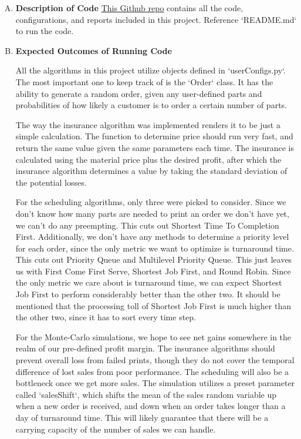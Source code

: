 \documentclass[11pt]{article}
\begin{document}
\begin{enumerate}[A. ]
    \item \textbf{Description of Code}
        \href{https://github.com/tylerTaerak/PrintingMoney}{This Github repo} contains all the code, configurations, and reports included in this project. Reference
        `README.md` to run the code.
    \item \textbf{Expected Outcomes of Running Code}

        All the algorithms in this project utilize objects defined in `userConfigs.py`. The most important one to keep track of is the `Order` class. It has the
        ability to generate a random order, given any user-defined parts and probabilities of how likely a customer is to order a certain number of parts.

        The way the insurance algorithm was implemented renders it to be just a simple calculation. The function to determine price should run very fast, and return the
        same value given the same parameters each time. The insurance is calculated using the material price plus the desired profit, after which the insurance algorithm
        determines a value by taking the standard deviation of the potential losses.

        For the scheduling algorithms, only three were picked to consider. Since we don't know how many parts are needed to print an order we don't have yet, we can't
        do any preempting. This cuts out Shortest Time To Completion First. Additionally, we don't have any methods to determine a priority level for each order,
        since the only metric we want to optimize is turnaround time. This cuts out Priority Queue and Multilevel Priority Queue. This just leaves us with First Come
        First Serve, Shortest Job First, and Round Robin. Since the only metric we care about is turnaround time, we can expect Shortest Job First to perform considerably
        better than the other two. It should be mentioned that the processing toll of Shortest Job First is much higher than the other two, since it has to sort every
        time step.

        For the Monte-Carlo simulations, we hope to see net gains somewhere in the realm of our pre-defined profit margin. The insurance algorithms should prevent overall
        loss from failed prints, though they do not cover the temporal difference of lost sales from poor performance. The scheduling will also be a bottleneck once
        we get more sales. The simulation utilizes a preset parameter called `salesShift`, which shifts the mean of the sales random variable up when a new order is received,
        and down when an order takes longer than a day of turnaround time. This will likely guarantee that there will be a carrying capacity of the number of sales we can handle.


\end{enumerate}
\end{document}
